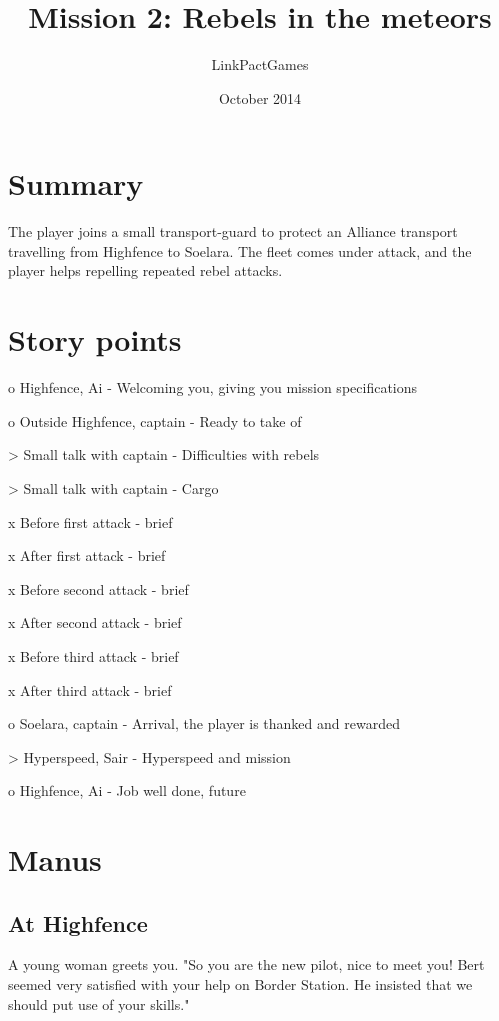 \documentclass[a4paper,12pt]{article}
\begin{document}
\title{Mission 2: Rebels in the meteors}
\author{LinkPactGames}
\date{October 2014}
\maketitle

\section{Summary}
The player joins a small transport-guard to protect an Alliance
transport travelling from Highfence to Soelara. The fleet comes under attack,
and the player helps repelling repeated rebel attacks.

\section{Story points}
o Highfence, Ai - Welcoming you, giving you mission specifications

o Outside Highfence, captain - Ready to take of

> Small talk with captain - Difficulties with rebels

> Small talk with captain - Cargo

x Before first attack - brief

x After first attack - brief

x Before second attack - brief

x After second attack - brief

x Before third attack - brief

x After third attack - brief

o Soelara, captain - Arrival, the player is thanked and rewarded

> Hyperspeed, Sair - Hyperspeed and mission

o Highfence, Ai - Job well done, future

\section{Manus}

\subsection{At Highfence}

A young woman greets you. "So you are the new pilot, nice to meet you!
Bert seemed very satisfied with your help on Border Station. He insisted
that we should put use of your skills."
\end{document}
